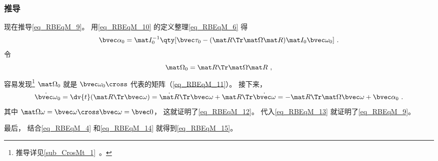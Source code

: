 \subsubsection{推导}
现在推导\autoref{eq_RBEqM_9}。 用\autoref{eq_RBEqM_10} 的定义整理\autoref{eq_RBEqM_6} 得
\begin{equation}\label{eq_RBEqM_13}
\bvec\alpha_0 = \mat I_0^{-1} \qty[\bvec \tau_0  - (\mat R\Tr\mat\Omega\mat R) \mat I_0 \bvec\omega_0]~.
\end{equation}
令
\begin{equation}\label{eq_RBEqM_14}
\mat\Omega_0 = \mat R\Tr\mat\Omega\mat R~,
\end{equation}
容易发现\footnote{推导详见\autoref{sub_CrosMt_1}~。} $\mat\Omega_0$ 就是 $\bvec\omega_0\cross$ 代表的矩阵（\autoref{eq_RBEqM_11}）。 接下来，
\begin{equation}
\dot{\bvec\omega}_0
= \dv{t}(\mat R\Tr \bvec\omega)
= \dot{\mat R}\Tr \bvec\omega + {\mat R}\Tr \dot{\bvec\omega}
= -\mat R\Tr\mat\Omega\bvec\omega + \bvec\alpha_0~.
\end{equation}
其中 $\mat\Omega\omega = \bvec\omega\cross\bvec\omega = \bvec 0$， 这就证明了\autoref{eq_RBEqM_12}。 代入\autoref{eq_RBEqM_13} 就证明了\autoref{eq_RBEqM_9}。

最后， 结合\autoref{eq_RBEqM_4} 和\autoref{eq_RBEqM_14} 就得到\autoref{eq_RBEqM_15}。
